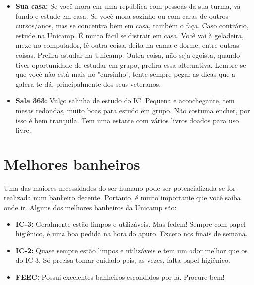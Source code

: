 \begin{itemize}
\item  \textbf{Sua casa:} Se você mora em uma república com pessoas da sua turma, vá fundo e estude em casa. Se você mora sozinho ou com caras de outros cursos/anos, mas se concentra bem em casa, também o faça. Caso contrário, estude na Unicamp. É muito fácil se distrair em casa. Você vai à geladeira, mexe no computador, lê outra coisa, deita na cama e dorme, entre outras coisas. Prefira estudar na Unicamp. Outra coisa, não seja egoísta, quando tiver oportunidade de estudar em grupo, prefira essa alternativa. Lembre-se que você não está mais no "cursinho", tente sempre pegar as dicas que a galera te dá, principalmente dos seus veteranos.
\end{itemize}

\begin{itemize}
\item  \textbf{Sala 363:} Vulgo salinha de estudo do IC. Pequena e aconchegante,
tem mesas redondas, muito boas para estudo em grupo. Não costuma encher, por isso
é bem tranquila. Tem uma estante com vários livros doados para uso livre.
\end{itemize}

\newpage
\section{Melhores banheiros}

Uma das maiores necessidades do ser humano pode ser potencializada se for
realizada num banheiro decente. Portanto, é muito importante que você saiba onde
ir. Alguns dos melhores banheiros da Unicamp são:

\begin{itemize}
\item  \textbf{IC-3:} Geralmente estão limpos e utilizáveis. Mas fedem! Sempre com papel higiênico, é uma boa pedida na hora do apuro. Exceto nos finais de semana.
\end{itemize}

\begin{itemize}
\item  \textbf{IC-2:} Quase sempre estão limpos e utilizáveis e tem um odor melhor que os do IC-3. Só precisa tomar cuidado pois, as vezes, falta papel higiênico.
\end{itemize}

\begin{itemize}
\item  \textbf{FEEC:} Possui excelentes banheiros escondidos por lá. Procure bem!
\end{itemize}


